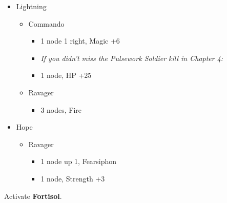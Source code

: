\begin{menu}
	\begin{itemize}
		\crystarium
		\begin{itemize}
			\item Lightning
			      \begin{itemize}
				      \item Commando
				            \begin{itemize}
					            \item 1 node 1 right, Magic +6
                                \item \textit{If you didn't miss the Pulsework Soldier kill in Chapter 4:}
										\item 1 node, HP +25
				            \end{itemize}
				      \item Ravager
				            \begin{itemize}
					            \item 3 nodes, Fire
				            \end{itemize}
			      \end{itemize}
			\item Hope
			      \begin{itemize}
				      \item Ravager
				            \begin{itemize}
					            \item 1 node up 1, Fearsiphon
					            \item 1 node, Strength +3
				            \end{itemize}
			      \end{itemize}
		\end{itemize}
	\end{itemize}
\end{menu}
Activate \textbf{Fortisol}.
\vfill

